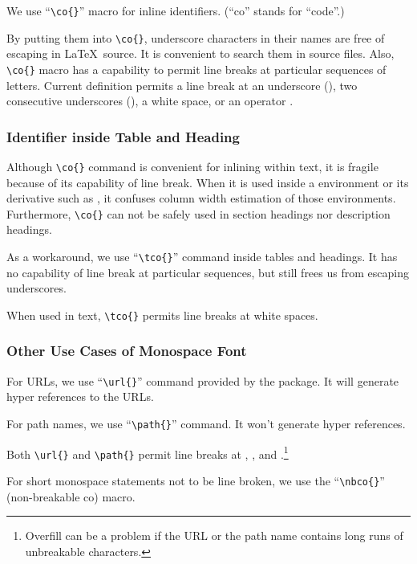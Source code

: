 We use ``\verb|\co{}|'' macro for inline identifiers.
(``co'' stands for ``code''.)

By putting them into \verb|\co{}|, underscore characters in
their names are free of escaping in \LaTeX\ source.
It is convenient to search them in source files.
Also, \verb|\co{}| macro has a capability to permit line breaks
at particular sequences of letters.
Current definition permits a line break at an underscore (\tco{_}),
two consecutive underscores (\tco{__}), a white space, or an
operator \tco{->}.

\subsubsection{Identifier inside Table and Heading}
\label{sec:app:styleguide:Identifier inside Table and Heading}

Although \verb|\co{}| command is convenient for inlining within text,
it is fragile because of its capability of line break.
When it is used inside a  environment or its derivative
such as , it confuses column width
estimation of those environments.
Furthermore, \verb|\co{}| can not be safely used in section headings nor
description headings.

As a workaround, we use ``\verb|\tco{}|'' command
inside tables and headings.
It has no capability of line break at particular sequences, but
still frees us from escaping underscores.

When used in text, \verb|\tco{}| permits line breaks at
white spaces.

\subsubsection{Other Use Cases of Monospace Font}
\label{sec:app:styleguide:Other Use Cases of Monospace Font}

For URLs, we use ``\verb|\url{}|'' command provided by the
 package.
It will generate hyper references to the URLs.

For path names, we use ``\verb|\path{}|'' command.
It won't generate hyper references.

Both \verb|\url{}| and \verb|\path{}| permit line breaks
at \qco{/}, \qco{-}, and .\footnote{
  Overfill can be a problem if the URL or the path name contains
  long runs of unbreakable characters.
}

For short monospace statements not to be line broken, we use
the ``\verb|\nbco{}|'' (non-breakable co) macro.

